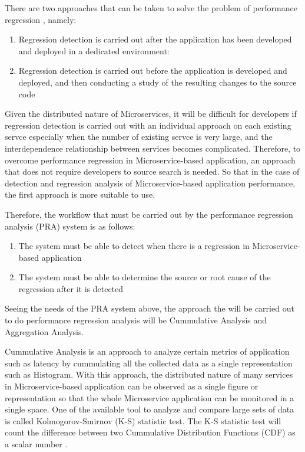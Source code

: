 \documentclass[conference]{configs/IEEEtran}
\begin{document}
There are two approaches that can be taken to solve the problem of performance regression \cite{regression-detection}, namely:
\begin{enumerate}
	\item Regression detection is carried out after the application has been developed and deployed in a dedicated environment:
	\item Regression detection is carried out before the application is developed and deployed, and then conducting a study of the resulting changes to the source code
\end{enumerate} 

Given the distributed nature of Microservices, it will be difficult for developers if regression detection is carried out with an individual approach on each existing servce especially when the number of existing servce is very large, and the interdependence relationship between services becomes complicated. Therefore, to overcome performance regression in Microservice-based application, an approach that does not require developers to source search is needed. So that in the case of detection and regression analysis of Microservice-based application performance, the first approach is more suitable to use.

Therefore, the workflow that must be carried out by the performance regression analysis (PRA) system is as follows:
\begin{enumerate}
	\item The system must be able to detect when there is a regression in Microservice-based application
	\item The system must be able to determine the source or root cause of the regression after it is detected
\end{enumerate}

Seeing the needs of the PRA system above, the approach the will be carried out to do performance regression analysis will be Cummulative Analysis and Aggregation Analysis. 

Cummulative Analysis is an approach to analyze certain metrics of application such as latency by cummulating all the collected data as a single representation such as Histogram. With this approach, the distributed nature of many services in Microservice-based application can be observed as a single figure or representation so that the whole Microservice application can be monitored in a single space. One of the available tool to analyze and compare large sets of data is called Kolmogorov-Smirnov (K-S) statistic test. The K-S statistic test will count the difference between two Cummulative Distribution Functions (CDF) as a scalar number \cite{kolmogorov_1951}.
\end{document}

